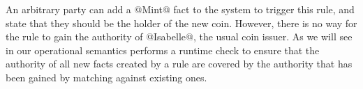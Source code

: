 An arbitrary party can add a @Mint@ fact to the system to trigger this rule, and state that they should be the holder of the new coin. However, there is no way for the rule to gain the authority of @Isabelle@, the usual coin issuer. As we will see in \REF our operational semantics performs a runtime check to ensure that the authority of all new facts created by a rule are covered by the authority that has been gained by matching against existing ones.

